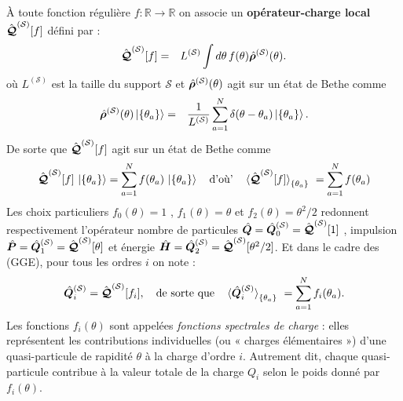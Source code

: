 
À toute fonction régulière
\(
  f:\mathbb R\!\to\!\mathbb R
\)
on associe un {\bf opérateur-charge local}  $\hat{\bm{\mathcal{Q}}}^{(\mathcal{S})}[f]$ défini par :
\begin{eqnarray}\label{chap.2.charge.f.1}
	\hat{\bm{\mathcal{Q}}}^{(\mathcal{S})}[f] & = &  L^{(\mathcal{S})} \int d\theta \, f(\theta) \hat{\bm{\rho}}^{(\mathcal{S})}(\theta).	
\end{eqnarray}
où $ L^{(\mathcal{S})}$ est la taille du support $\mathcal{S}$ et  $\hat{\bm{\rho}}^{(\mathcal{S})}(\theta)$ agit sur un état de Bethe comme 
\begin{eqnarray}\label{chap.2.rho.1}
	 \hat{\bm{\rho}}^{(\mathcal{S})}(\theta) \ket{ \{ \theta_a \} } &=& \frac{1}{L^{(\mathcal{S})}} \sum_{a = 1 }^N  \delta ( \theta - \theta_a ) \ket{ \{ \theta_a \} }.	
\end{eqnarray}
De sorte que $\hat{\bm{\mathcal{Q}}}^{(\mathcal{S})}[f]$ agit sur un état de Bethe comme
\begin{eqnarray}\label{chap.2.charge.1}
	\operator{\mathcal{Q}}^{(\mathcal{S})}[f]\,\ket{\{\theta_a\} } =  \sum_{a=1}^{N}f(\theta_a)\,\ket{\{\theta_a\} } \quad \mbox{d'où'} \quad \braket{\operator{\mathcal{Q}}^{(\mathcal{S})}[f]}_{\{\theta_a\}} = \sum_{a=1}^N f(\theta_a)
\end{eqnarray}
Les choix particuliers
\(
  f_0(\theta)=1
\)
,
\(
  f_1(\theta)=\theta
\)
et
\(
  f_2(\theta)=\theta^{2}/2
\)
redonnent respectivement l'opérateur nombre de particules \(\hat{\bm{Q}}=\hat{\bm{Q}}_0^{(\mathcal{S})} = \hat{\bm{\mathcal{Q}}}^{(\mathcal{S})}[1]\) , impulsion \(\hat{\bm{P}}=\hat{\bm{Q}}_1^{(\mathcal{S})} = \hat{\bm{\mathcal{Q}}}^{(\mathcal{S})}[\theta]\) et énergie \(\hat{\bm{H}}=\hat{\bm{Q}}_2^{(\mathcal{S})} = \hat{\bm{\mathcal{Q}}}^{(\mathcal{S})}[\theta^2/2]\). Et dans le cadre des (\gls{GGE}), pour tous les ordres $i$ on note :
\begin{eqnarray}\label{chap.2.charge.ordre.i.1}
	\operator{Q}^{(\mathcal{S})}_i = \operator{\mathcal{Q}}^{(\mathcal{S})}[f_i]	, \quad \mbox{de sorte que} \quad \braket{\operator{Q}^{(\mathcal{S})}_i}_{\{\theta_a\}} = \sum_{a=1}^N f_i(\theta_a). 
\end{eqnarray}
Les fonctions \(f_i(\theta)\) sont appelées {\em fonctions spectrales de charge} : elles représentent les contributions individuelles (ou « charges élémentaires ») d’une quasi-particule de rapidité \(\theta\) à la charge d’ordre \(i\).  
Autrement dit, chaque quasi-particule contribue à la valeur totale de la charge \(Q_i\) selon le poids donné par \(f_i(\theta)\).  

